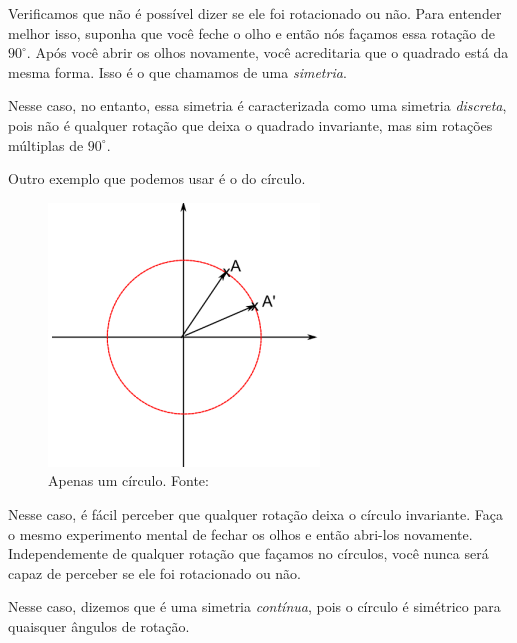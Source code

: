 \documentclass{article}
\numberwithin{equation}{section}
\numberwithin{figure}{section}
\begin{document}
Verificamos que não é possível dizer se ele foi rotacionado ou não. Para entender melhor isso, suponha que você feche o olho e então nós façamos essa rotação de $90^{\circ}$. Após você abrir os olhos novamente, você acreditaria que o quadrado está da mesma forma. Isso é o que chamamos de uma \textit{simetria}. 

Nesse caso, no entanto, essa simetria é caracterizada como uma simetria \textit{discreta}, pois não é qualquer rotação que deixa o quadrado invariante, mas sim rotações múltiplas de $90^{\circ}$. 

Outro exemplo que podemos usar é o do círculo. 
\begin{figure}[H]
	\centering
	\includegraphics[scale=0.5]{figures/circ.png}
	\caption{Apenas um círculo. Fonte: \cite{jakob}}
\end{figure}
Nesse caso, é fácil perceber que qualquer rotação deixa o círculo invariante. Faça o mesmo experimento mental de fechar os olhos e então abri-los novamente. Independemente de qualquer rotação que façamos no círculos, você nunca será capaz de perceber se ele foi rotacionado ou não. 

Nesse caso, dizemos que é uma simetria \textit{contínua}, pois o círculo é simétrico para quaisquer ângulos de rotação. 
\end{document}
